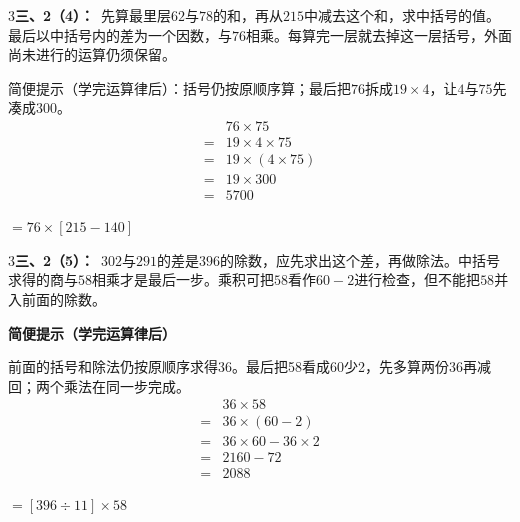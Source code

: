 \documentclass[multi=snippet,border={5bp 20bp 5bp 5bp}]{standalone}
\newenvironment{snippet}[3]{\begin{minipage}{#1bp}\color{answerred}\fontsize{#2}{#3}\selectfont\raggedright}{\end{minipage}}
\begin{document}
\begin{snippet}{505}{11.5}{14}\begin{multicols}{3}\raggedcolumns \textbf{三、2（4）：}\ 先算最里层\(62\)\allowbreak 与\(78\)\allowbreak 的和，再从\(215\)\allowbreak 中减去这个和，求中括号的值。最后以中括号内的差为一个因数，与\(76\)\allowbreak 相乘。每算完一层就去掉这一层括号，外面尚未进行的运算仍须保留。\par 简便提示（学完运算律后）：括号仍按原顺序算；最后把\(76\)\allowbreak 拆成\(19\times4\)\allowbreak ，让\(4\)\allowbreak 与\(75\)\allowbreak 先凑成\(300\)\allowbreak 。\[\begin{aligned}&76\times75\\={}&19\times4\times75\\={}&19\times(4\times75)\\={}&19\times300\\={}&5700\end{aligned}\]\end{multicols}\end{snippet}
\begin{snippet}{92.05938110351565}{10}{12.8}\SourceSans\setlength{\mathindent}{2bp}\(\displaystyle=76\times[215-140]\)\end{snippet}
\begin{snippet}{505}{11.5}{14}\begin{multicols}{3}\raggedcolumns \textbf{三、2（5）：}\ \(302\)\allowbreak 与\(291\)\allowbreak 的差是\(396\)\allowbreak 的除数，应先求出这个差，再做除法。中括号求得的商与\(58\)\allowbreak 相乘才是最后一步。乘积可把\(58\)\allowbreak 看作\(60-2\)\allowbreak 进行检查，但不能把\(58\)\allowbreak 并入前面的除数。\par\textbf{简便提示（学完运算律后）}\par 前面的括号和除法仍按原顺序求得36。最后把58看成60少2，先多算两份36再减回；两个乘法在同一步完成。\[\begin{aligned}&36\times58\\={}&36\times(60-2)\\={}&36\times60-36\times2\\={}&2160-72\\={}&2088\end{aligned}\]\end{multicols}\end{snippet}
\begin{snippet}{87.0875946044922}{10}{12.8}\SourceSans\setlength{\mathindent}{2bp}\(\displaystyle=[396\div11]\times58\)\end{snippet}
\end{document}
